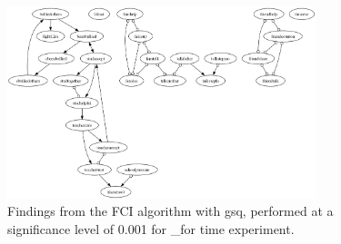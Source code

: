 \begin{figure}[htbp]
    \centering
    \includegraphics[width=0.8\textwidth]{Report/final_report/pictures/FCI_gsq_0.001__for time experiment.png}
    \caption{Findings from the FCI algorithm with gsq, performed at a significance level of 0.001 for _for time experiment.}
    \label{fig:fci_gsq_0.001_for time experiment}
\end{figure}
